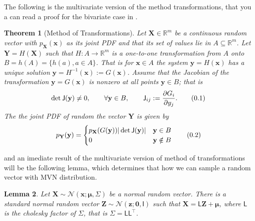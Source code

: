 \documentclass[10pt]{article}
\newtheorem{thm}{Theorem}[section]
\newtheorem{lem}[thm]{Lemma}
\theoremstyle{definition}
\newcommand\eqnum{\addtocounter{equation}{1}\tag{\arabic{section}.\arabic{equation}}}
\begin{document}
The following is the multivariate version of the method transformations, that you a can read a proof for the bivariate case in \cite{Gharamani2019}.
\begin{thm}[Method of Transformations]\label{thm:MT:MV}
Let $\mathbf{X}\in\mathbb{R}^m$ be a continuous random vector with  $p_\mathbf{X}(\mathbf{x})$ as its joint PDF and that its set of values lie in $A\subseteq\mathbb{R}^m$. Let $\mathbf{Y}=H(\mathbf{X})$ such that $H:A\to\mathbb{R}^m$ is a one-to-one transformation from $A$ onto $B=h(A)=\{h(a), a\in A\}$. That is for $\mathbf{x}\in A$ the system $\mathbf{y}=H(\mathbf{x})$ has a unique solution $\mathbf{y}=H^{-1}(\mathbf{x}):=G(\mathbf{x})$. Assume that the Jacobian of the transformation $\mathbf{y} = G(\mathbf{x})$ is nonzero at all points $\mathbf{y}\in B$; that is
\begin{equation*}
\det\mathsf{J}(\mathbf{y})\ne 0, \qquad \forall \mathbf{y}\in B, \qquad \mathsf{J}_{ij} := \frac{\partial G_i}{\partial y_j}.
\eqnum
\end{equation*}
The the joint PDF of random the vector $\mathbf{Y}$ is given by
\begin{equation*}
p_{\mathbf{Y}}(\mathbf{y}) = 
\begin{cases}
p_{\mathbf{X}}(G(\mathbf{y})) |\det\mathsf{J}(\mathbf{y})| & \mathbf{y} \in B \\
0 & \mathbf{y} \notin B
\end{cases}
\eqnum
\end{equation*}
\end{thm}
\noindent
and an imediate result of the multivariate version of method of transformations will be the following lemma, which determines that how we can sample a random vector with MVN distribution.
\begin{lem}
Let $\mathbf{X}\sim\mathcal{N}(\mathbf{x};\boldsymbol{\mu},\mathsf{\Sigma})$ be a normal random vector. There is a standard normal random vector $\mathbf{Z}\sim\mathcal{N}(\mathbf{z};\mathbf{0},\mathsf{I})$ such that $\mathbf{X}=\mathsf{L}\mathbf{Z}+\boldsymbol{\mu}$, where $\mathsf{L}$ is the cholesky factor of $\mathsf{\Sigma}$, that is $\mathsf{\Sigma} = \mathsf{L}\mathsf{L}^{\top}$.
\end{lem}
\end{document}
